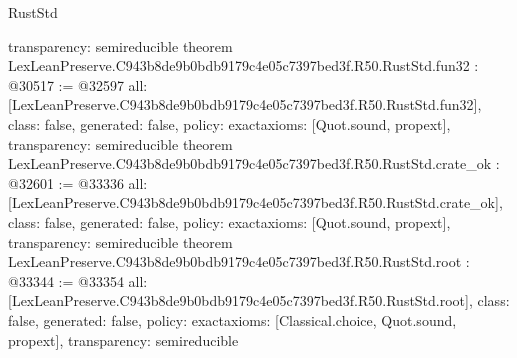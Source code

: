 \begin{lexlean}{RustStd}
\begin{coremodule}
{  transparency: semireducible
}
theorem LexLeanPreserve.C943b8de9b0bdb9179c4e05c7397bed3f.R50.RustStd.fun32 : @30517 := @32597 {
  all: [LexLeanPreserve.C943b8de9b0bdb9179c4e05c7397bed3f.R50.RustStd.fun32],
  class: false,
  generated: false,
  policy: exact{axioms: [Quot.sound, propext]},
  transparency: semireducible
}
theorem LexLeanPreserve.C943b8de9b0bdb9179c4e05c7397bed3f.R50.RustStd.crate_ok : @32601 := @33336 {
  all: [LexLeanPreserve.C943b8de9b0bdb9179c4e05c7397bed3f.R50.RustStd.crate_ok],
  class: false,
  generated: false,
  policy: exact{axioms: [Quot.sound, propext]},
  transparency: semireducible
}
theorem LexLeanPreserve.C943b8de9b0bdb9179c4e05c7397bed3f.R50.RustStd.root : @33344 := @33354 {
  all: [LexLeanPreserve.C943b8de9b0bdb9179c4e05c7397bed3f.R50.RustStd.root],
  class: false,
  generated: false,
  policy: exact{axioms: [Classical.choice, Quot.sound, propext]},
  transparency: semireducible
}


\end{coremodule}
\end{lexlean}
